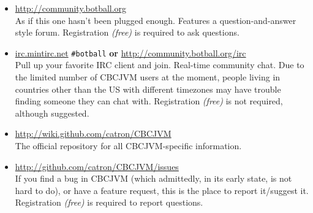 \documentclass[12pt,letterpaper]{article}
\begin{document}
\begin{itemize}
\item \url{http://community.botball.org}\\
      As if this one hasn't been plugged enough. Features a question-and-answer style forum. Registration \textit{(free)} is required to ask questions.
\item \url{irc.mintirc.net} \texttt{{\#}botball} \textbf{or} \url{http://community.botball.org/irc}\\
      Pull up your favorite IRC client and join. Real-time community chat. Due to the limited number of CBCJVM users at the moment, people living in countries other than the US with different timezones may have trouble finding someone they can chat with. Registration \textit{(free)} is not required, although suggested.
\item \url{http://wiki.github.com/catron/CBCJVM}\\
      The official repository for all CBCJVM-specific information.
\item \url{http://github.com/catron/CBCJVM/issues}\\
      If you find a bug in CBCJVM (which admittedly, in its early state, is not hard to do), or have a feature request, this is the place to report it/suggest it. Registration \textit{(free)} is required to report questions.
\end{itemize}



\end{document}
